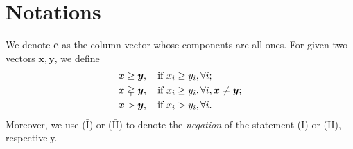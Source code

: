 \documentclass[12pt]{article}
\begin{document}
\section{Notations}
We denote $\bm e$ as the column vector whose components are all ones. For given two vectors $\bm x,\bm y$, we define
\begin{align*}
\bm x&\ge\bm y,\quad\text{if $x_i\ge y_i,\forall i$};\\
\bm x&\gvertneqq\bm y,\quad\text{if $x_i\ge y_i,\forall i, \bm x\ne\bm y$};\\
\bm x&>\bm y,\quad\text{if $x_i> y_i,\forall i$}.
\end{align*}
Moreover, we use ($\bar{\text{I}}$) or ($\bar{\text{II}}$) to denote the \emph{negation} of the statement (I) or (II), respectively.
%
%
%
%
%
%
%
%
%
%
%
\end{document}
